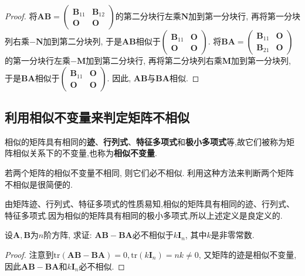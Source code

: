 \documentclass[../../main.tex]{subfiles}%
\begin{document}
\begin{proof}
将\(\boldsymbol{AB}=\begin{pmatrix}\boldsymbol{B}_{11}&\boldsymbol{B}_{12}\\\boldsymbol{O}&\boldsymbol{O}\end{pmatrix}\)的第二分块行左乘\(\boldsymbol{N}\)加到第一分块行, 再将第一分块列右乘\(-\boldsymbol{N}\)加到第二分块列, 于是\(\boldsymbol{AB}\)相似于\(\begin{pmatrix}\boldsymbol{B}_{11}&\boldsymbol{O}\\\boldsymbol{O}&\boldsymbol{O}\end{pmatrix}\). 将\(\boldsymbol{BA}=\begin{pmatrix}\boldsymbol{B}_{11}&\boldsymbol{O}\\\boldsymbol{B}_{21}&\boldsymbol{O}\end{pmatrix}\)的第一分块行左乘\(-\boldsymbol{M}\)加到第二分块行, 再将第二分块列右乘\(\boldsymbol{M}\)加到第一分块列, 于是\(\boldsymbol{BA}\)相似于\(\begin{pmatrix}\boldsymbol{B}_{11}&\boldsymbol{O}\\\boldsymbol{O}&\boldsymbol{O}\end{pmatrix}\). 因此, \(\boldsymbol{AB}\)与\(\boldsymbol{BA}\)相似.
\end{proof}

\subsection{利用相似不变量来判定矩阵不相似}

\begin{definition}[相似不变量]
相似的矩阵具有相同的\textbf{迹}、\textbf{行列式}、\textbf{特征多项式}和\textbf{极小多项式}等,故它们被称为矩阵相似关系下的不变量,也称为\textbf{相似不变量}. 
\end{definition}
\begin{remark}
若两个矩阵的相似不变量不相同, 则它们必不相似. 利用这种方法来判断两个矩阵不相似是很简便的. 
\end{remark}
\begin{note}
由矩阵迹、行列式、特征多项式的性质易知,相似的矩阵具有相同的迹、行列式、特征多项式.因为相似的矩阵具有相同的极小多项式,所以上述定义是良定义的.
\end{note}

\begin{example}
设\(\boldsymbol{A},\boldsymbol{B}\)为\(n\)阶方阵, 求证: \(\boldsymbol{AB}-\boldsymbol{BA}\)必不相似于\(k\boldsymbol{I}_{n}\), 其中\(k\)是非零常数.
\end{example}
\begin{proof}
注意到\(\mathrm{tr}(\boldsymbol{AB}-\boldsymbol{BA}) = 0,\mathrm{tr}(k\boldsymbol{I}_{n}) = nk\neq 0\), 又矩阵的迹是相似不变量, 因此\(\boldsymbol{AB}-\boldsymbol{BA}\)和\(k\boldsymbol{I}_{n}\)必不相似.
\end{proof}
\end{document}
